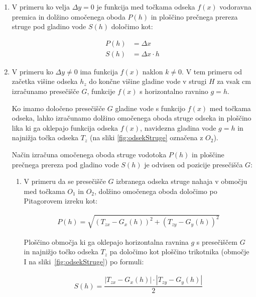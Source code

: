 \begin{enumerate}

\item V primeru ko velja $\Delta y = 0$ je funkcija med točkama odseka $f(x)$ vodoravna premica in dolžino omočenega oboda $P(h)$ in ploščino prečnega prereza struge pod gladino vode $S(h)$ določimo kot:

\begin{ceqn}
\begin{align}
P(h)&= \Delta x\\
S(h)&= \Delta x \cdot h
\end{align}
\end{ceqn}


\item V primeru ko $\Delta y \neq 0$ ima funkcija $f(x)$ naklon $k \neq 0$. V tem primeru od začetka višine odseka $h_z$ do končne višine gladine vode v strugi $H$ za vsak cm izračunamo presečišče $G$, funkcije $f(x)$ s horizontalno ravnino $g = h$. 


Ko imamo določeno presečišče $G$ gladine vode s funkcijo $f(x)$ med točkama odseka, lahko izračunamo dolžino omočenega oboda struge odseka in ploščino lika ki ga oklepajo funkcija odseka $f(x)$, navidezna gladina vode $g = h$ in najnižja točka odseka $T_z$ (na sliki \ref{fig:odsekStruge} označena z $O_2$). 



Način izračuna omočenega oboda struge vodotoka $P(h)$ in ploščine prečnega prereza pod gladino vode $S(h)$ je odvisen od pozicije presečišča $G$:


\begin{enumerate}
	\item V primeru da se presečišče $G$ izbranega odseka struge nahaja v območju med točkama $O_1$ in $O_2$, dolžino omočenega oboda določimo po Pitagorovem izreku kot:
	
	\begin{ceqn}
		\begin{align}
		P(h) = \sqrt{(T_{zx} - G_x(h))^{2} + (T_{zy} - G_y(h))^{2}}
		\end{align}
	\end{ceqn}
	
	
	Ploščino območja ki ga oklepajo horizontalna ravnina $g$ s presečiščem $G$ in najnižjo točko odseka $T_z$ pa določimo kot ploščino trikotnika (območje I na sliki~\ref{fig:odsekStruge}) po formuli:
	
	\begin{ceqn}
		\begin{align}
		S(h) = \dfrac{|T_{zx} - G_x(h)| \cdot |T_{zy} - G_y(h)|}{2}
		\end{align}
	\end{ceqn}
	

\end{enumerate}
\end{enumerate}
